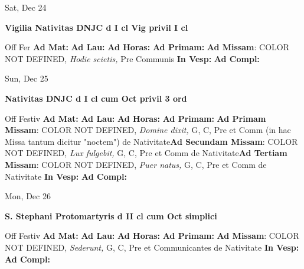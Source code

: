 \documentclass[10pt]{memoir}
\begin{document}
\begin{center}
\begin{minipage}{3.5in}
\vspace{2em}
\begin{center}Sat, Dec 24
\end{center}
\textbf{ \large Vigilia Nativitas DNJC
\textnormal{\normalsize d I cl Vig privil I cl}}

\begin{justify}Off Fer
\textbf{Ad Mat: }
\textbf{Ad Lau: }
\textbf{Ad Horas: }
\textbf{Ad Primam: }\textbf{Ad Missam}: COLOR NOT DEFINED, \textit{Hodie scietis,} Pre Communis
\textbf{In Vesp: }
\textbf{Ad Compl: }
\end{justify}
\end{minipage}
\end{center}

\begin{center}
\begin{minipage}{3.5in}
\vspace{2em}
\begin{center}Sun, Dec 25
\end{center}
\textbf{ \large Nativitas DNJC
\textnormal{\normalsize d I cl cum Oct privil 3 ord}}

\begin{justify}Off Festiv
\textbf{Ad Mat: }
\textbf{Ad Lau: }
\textbf{Ad Horas: }
\textbf{Ad Primam: }\textbf{Ad Primam Missam}: COLOR NOT DEFINED, \textit{Domine dixit,} G, C, Pre et Comm (in hac Missa tantum dicitur "noctem") de Nativitate\textbf{Ad Secundam Missam}: COLOR NOT DEFINED, \textit{Lux fulgebit,} G, C, Pre et Comm de Nativitate\textbf{Ad Tertiam Missam}: COLOR NOT DEFINED, \textit{Puer natus,} G, C, Pre et Comm de Nativitate
\textbf{In Vesp: }
\textbf{Ad Compl: }
\end{justify}
\end{minipage}
\end{center}

\begin{center}
\begin{minipage}{3.5in}
\vspace{2em}
\begin{center}Mon, Dec 26
\end{center}
\textbf{ \large S. Stephani Protomartyris
\textnormal{\normalsize d II cl cum Oct simplici}}

\begin{justify}Off Festiv
\textbf{Ad Mat: }
\textbf{Ad Lau: }
\textbf{Ad Horas: }
\textbf{Ad Primam: }\textbf{Ad Missam}: COLOR NOT DEFINED, \textit{Sederunt,} G, C, Pre et Communicantes de Nativitate
\textbf{In Vesp: }
\textbf{Ad Compl: }
\end{justify}
\end{minipage}
\end{center}
\end{document}
